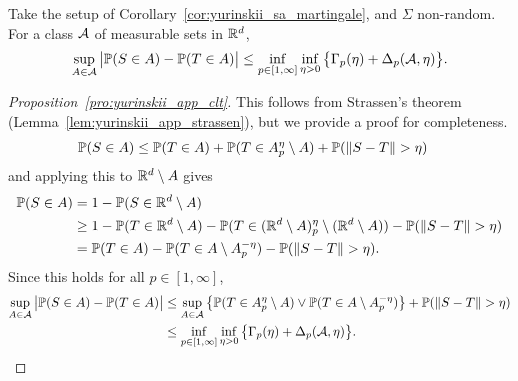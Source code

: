 \begin{proposition}%
  \label{pro:yurinskii_app_clt}

  Take the setup of Corollary~\ref{cor:yurinskii_sa_martingale},
  and $\Sigma$ non-random.
  For a class $\cA$ of measurable sets in $\R^d$,
  \begin{equation}%
    \label{eq:yurinskii_app_high_dim_clt}
    \sup_{A\in \cA}
    \big|\P(S\in A) -\P(T\in A)\big|
    \leq \inf_{p \in [1, \infty]} \inf_{\eta>0}
    \big\{\Gamma_p(\eta) + \Delta_p(\cA, \eta) \big\}.
  \end{equation}
\end{proposition}

\begin{proof}[Proposition~\ref{pro:yurinskii_app_clt}]

  This follows from Strassen's theorem
  (Lemma~\ref{lem:yurinskii_app_strassen}), but we
  provide a proof for completeness.
  \begin{align*}
    \P(S \in A)
    &\leq
    \P(T \in A)
    + \P(T \in A_p^\eta \setminus A)
    + \P(\|S - T\| > \eta)
  \end{align*}
  and applying this to $\R^d \setminus A$ gives
  \begin{align*}
    \P(S\in A)
    &=
    1 - \P(S\in \R^d \setminus A) \\
    &\geq
    1 - \P(T \in \R^d \setminus A)
    - \P(T \in (\R^d \setminus A)_p^\eta \setminus (\R^d \setminus A))
    - \P(\|S - T\| > \eta) \\
    &=
    \P(T \in A)
    - \P(T \in A \setminus A_p^{-\eta})
    - \P(\|S - T\| > \eta).
  \end{align*}
  Since this holds for all $p \in [1, \infty]$,
  \begin{align*}
    \sup_{A\in \cA}
    \big|\P(S\in A) -\P(T\in A)\big|
    &\leq
    \sup_{A \in \cA}
    \big\{\P(T \in A_p^\eta\setminus A)
    \vee \P(T \in A \setminus A_p^{-\eta})\big\}
    + \P(\|S - T\| > \eta) \\
    &\leq
    \inf_{p \in [1, \infty]} \inf_{\eta>0}
    \big\{\Gamma_p(\eta) + \Delta_p(\cA, \eta) \big\}.
  \end{align*}
\end{proof}

